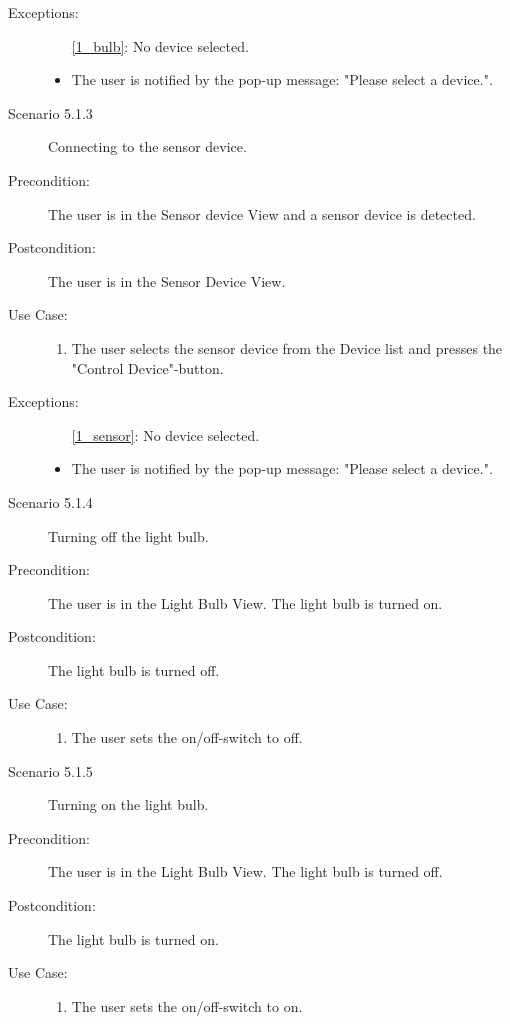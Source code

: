 \documentclass[a4paper]{article}
\begin{document}
\begin{description}
\item[Exceptions:]
\item[]
\begin{itemize}
\item [\ref{1_bulb}:] No device selected.
\item The user is notified by the pop-up message: "Please select a device.".
\end{itemize}


\item[]

\item[Scenario 5.1.3] Connecting to the sensor device.
\item[Precondition:] The user is in the Sensor device View and a sensor device is detected.
\item[Postcondition:] The user is in the Sensor Device View.
\item[Use Case:]\mbox{}
\begin{enumerate}
\item \label{1_sensor} The user selects the sensor device from the Device list and presses the "Control Device"-button.
\end{enumerate}


\item[Exceptions:]
\item[]
\begin{itemize}
\item [\ref{1_sensor}:] No device selected.
\item The user is notified by the pop-up message: "Please select a device.".
\end{itemize}

\item[]

\item[Scenario 5.1.4] Turning off the light bulb.
\item[Precondition:] The user is in the Light Bulb View. The light bulb is turned on.
\item[Postcondition:] The light bulb is turned off.
\item[Use Case:]\mbox{}
\begin{enumerate}
\item  The user sets the on/off-switch to off.
\end{enumerate}

\item[]

\item[Scenario 5.1.5] Turning on the light bulb.
\item[Precondition:] The user is in the Light Bulb View. The light bulb is turned off.
\item[Postcondition:] The light bulb is turned on.
\item[Use Case:]\mbox{}
\begin{enumerate}
\item  The user sets the on/off-switch to on.
\end{enumerate}


\end{description}
\end{document}
